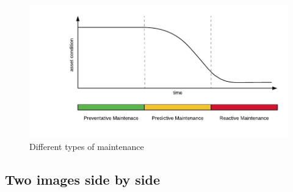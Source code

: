\begin{figure}[H]
	\begin{center}
		\includegraphics[width=.9\textwidth, clip, trim=1cm 1cm 0.5cm 0.5cm]{Resources/Images/Maintenance/maintenance_types.pdf}
	\end{center}
	\caption{Different types of maintenance}
	\label{fig:images:maintenance_types}
\end{figure}

\subsection{Two images side by side}
\label{sec:images:two_images}

